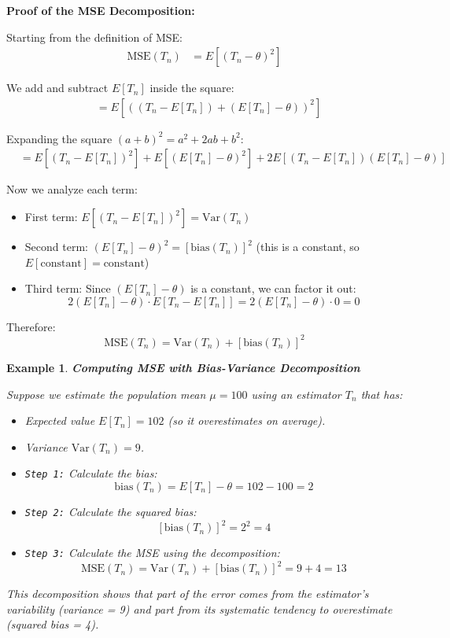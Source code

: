 \documentclass[11pt]{article}
\theoremstyle{smallexample}
\newtheorem{example}{Example}[section]
\begin{document}
{\footnotesize
\textbf{Proof of the MSE Decomposition:}

Starting from the definition of MSE:
\begin{align*}
\text{MSE}(T_n) &= E\left[(T_n - \theta)^2\right]
\end{align*}

We add and subtract $E[T_n]$ inside the square:
\begin{align*}
&= E\left[\left((T_n - E[T_n]) + (E[T_n] - \theta)\right)^2\right]
\end{align*}

Expanding the square $(a + b)^2 = a^2 + 2ab + b^2$:
\begin{align*}
&= E\left[(T_n - E[T_n])^2\right] + E\left[(E[T_n] - \theta)^2\right] + 2E\left[(T_n - E[T_n])(E[T_n] - \theta)\right]
\end{align*}

Now we analyze each term:
\begin{itemize}
    \item First term: $E\left[(T_n - E[T_n])^2\right] = \text{Var}(T_n)$
    \item Second term: $(E[T_n] - \theta)^2 = [\text{bias}(T_n)]^2$ (this is a constant, so $E[\text{constant}] = \text{constant}$)
    \item Third term: Since $(E[T_n] - \theta)$ is a constant, we can factor it out:
    \[
    2(E[T_n] - \theta) \cdot E[T_n - E[T_n]] = 2(E[T_n] - \theta) \cdot 0 = 0
    \]
\end{itemize}

Therefore:
\[
\text{MSE}(T_n) = \text{Var}(T_n) + [\text{bias}(T_n)]^2
\]
}

\vspace{0.2cm}
\begin{example}{\textbf{Computing MSE with Bias-Variance Decomposition}}

Suppose we estimate the population mean $\mu = 100$ using an estimator $T_n$ that has:
\begin{itemize}
    \item Expected value $E[T_n] = 102$ (so it overestimates on average).
    \item Variance $\text{Var}(T_n) = 9$.
\end{itemize}

\begin{itemize}
    \item \texttt{Step 1:} Calculate the bias:
    \[
    \text{bias}(T_n) = E[T_n] - \theta = 102 - 100 = 2
    \]
    \item \texttt{Step 2:} Calculate the squared bias:
    \[
    [\text{bias}(T_n)]^2 = 2^2 = 4
    \]
    \item \texttt{Step 3:} Calculate the MSE using the decomposition:
    \[
    \text{MSE}(T_n) = \text{Var}(T_n) + [\text{bias}(T_n)]^2 = 9 + 4 = 13
    \]
\end{itemize}

This decomposition shows that part of the error comes from the estimator's variability (variance = 9) and part from its systematic tendency to overestimate (squared bias = 4).
\end{example}
    
\end{document}
